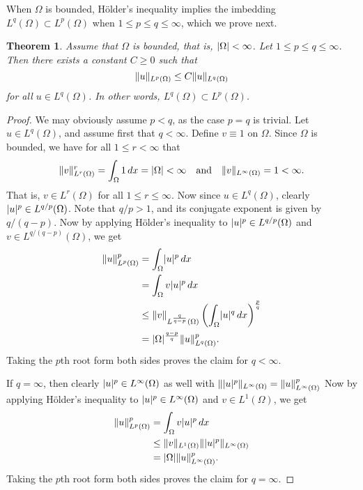 \documentclass[english, 12pt, a4paper, sci, utf8, a-2b, online]{aaltothesis}
\theoremstyle{definition}
\theoremstyle{plain}
\newtheorem{theorem}{Theorem}[section]
\DeclarePairedDelimiter\abs{\lvert}{\rvert}
\DeclarePairedDelimiter\norm{\lVert}{\rVert}
\newcommand*\diff{\mathop{}\!d}
\numberwithin{equation}{section}
\begin{document}
When $\Omega$ is bounded, Hölder's inequality implies the imbedding
$L^q(\Omega) \subset L^p(\Omega)$ when $1 \leq p \leq q \leq \infty$,
which we prove next.
\begin{theorem}
    \label{thm:lpimbedding}
    Assume that $\Omega$ is bounded, that is, $\abs{\Omega} < \infty$.
    Let $1 \leq p \leq q \leq \infty$.
    Then there exists a constant $C \geq 0$ such that
    \begin{equation*}
        \norm{u}_{L^p(\Omega)} \leq C \norm{u}_{L^q(\Omega)}
    \end{equation*}
    for all $u \in L^q(\Omega)$. In other words, $L^q(\Omega) \subset L^p(\Omega)$.
\end{theorem}
\begin{proof}
    We may obviously assume $p < q$, as the case $p=q$ is trivial.
    Let $u \in L^q(\Omega)$, and assume first that $q < \infty$.
    Define $v \equiv 1$ on $\Omega$. Since $\Omega$ is bounded, we have
    for all $1 \leq r < \infty$ that
    \begin{equation*}
        \norm{v}_{L^r(\Omega)}^r
        = \int_{\Omega} 1 \diff x
        = \abs{\Omega}
        < \infty
        \quad \text{and} \quad
        \norm{v}_{L^{\infty}(\Omega)} = 1 < \infty.
    \end{equation*}
    That is, $v \in L^r(\Omega)$ for all $1 \leq r \leq \infty$.
    Now since $u \in L^q(\Omega)$, clearly $\abs{u}^p \in L^{q/p}(\Omega)$.
    Note that $q/p > 1$, and its conjugate exponent is given by
    $q/(q-p)$. Now by applying Hölder's inequality to
    $\abs{u}^p \in L^{q/p}(\Omega)$ and $v \in L^{q/(q-p)}(\Omega)$,
    we get
    \begin{align*}
        \norm{u}_{L^p(\Omega)}^p
        &= \int_{\Omega} \abs{u}^p \diff x \\
        &= \int_{\Omega} v \abs{u}^p \diff x \\
        &\leq \norm{v}_{L^{\frac{q}{q-p}}(\Omega)}
              \left( \int_{\Omega} \abs{u}^q \diff x \right)^{\frac{p}{q}} \\
        &= \abs{\Omega}^{\frac{q-p}{q}} \norm{u}_{L^q(\Omega)}^p.
    \end{align*}
    Taking the $p$th root form both sides proves the claim for $q < \infty$.

    If $q=\infty$, then clearly $\abs{u}^p \in L^{\infty}(\Omega)$ as well
    with $\norm{\abs{u}^p}_{L^{\infty}(\Omega)} = \norm{u}_{L^{\infty}(\Omega)}^p$
    Now by applying Hölder's inequality to
    $\abs{u}^p \in L^{\infty}(\Omega)$ and $v \in L^1(\Omega)$, we get
    \begin{align*}
        \norm{u}_{L^p(\Omega)}^p
        &= \int_{\Omega} v \abs{u}^p \diff x \\
        &\leq \norm{v}_{L^1(\Omega)} \norm{\abs{u}^p}_{L^{\infty}(\Omega)} \\
        &= \abs{\Omega} \norm{u}_{L^{\infty}(\Omega)}^p.
    \end{align*}
    Taking the $p$th root form both sides proves the claim for $q = \infty$.
\end{proof}
\end{document}

